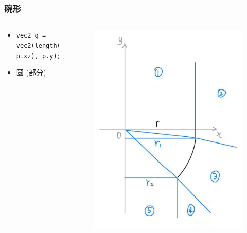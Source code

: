 \documentclass[aspectratio=169]{ctexbeamer} %
\begin{document}
\begin{frame}
    \frametitle{碗形} %
    \begin{columns}
        \begin{column}{.6\textwidth}
            \begin{itemize}
                \item \texttt{vec2 q = vec2(length(p.xz), p.y);}
                \item 圆 (部分)
            \end{itemize}
        \end{column}
        \begin{column}{.4\textwidth}
            \begin{figure}[htbp]
                \centering
                \includegraphics[height=.65\textheight]{images/pre/bowl_derive.pdf}
                \caption{}
                \label{fig:bowl_derive}
            \end{figure}
        \end{column}
    \end{columns}
\end{frame}
\end{document}
